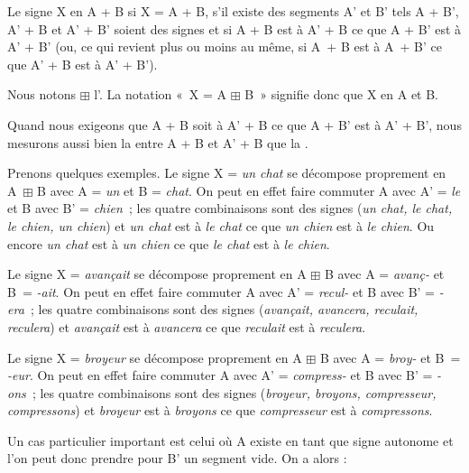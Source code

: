 {Le signe X  en A + B si X = A + B, s’il existe des segments A’ et B’ tels A + B’, A’ + B et A’ + B’ soient des signes et si {A +} {B est à A’} {+} {B ce que A +} {B’} {est à A’} {+} {B’} (ou, ce qui revient plus ou moins au même, si A~+ B est à A~+ B’ ce que A’ + B est à A’ + B’).}

{Nous notons ${\boxplus}$ l’. La notation «~X = A ${\boxplus}$ B~» signifie donc que X  en A et B.}

Quand nous exigeons que A + B soit à A’ + B ce que A + B’ est à A’ + B’, nous mesurons aussi bien la  entre A + B et A’ + B que la .

Prenons quelques exemples. Le signe X = \textit{un chat} se décompose proprement en A~${\boxplus}$ B avec A = \textit{un} et B = \textit{chat}. On peut en effet faire commuter A avec A’ = \textit{le} et B avec B’ = \textit{chien~}; les quatre combinaisons sont des signes (\textit{un chat, le chat, le chien, un chien}) et \textit{un chat} est à \textit{le chat} ce que \textit{un chien} est à \textit{le chien}. Ou encore \textit{un chat} est à \textit{un chien} ce que \textit{le chat} est à \textit{le chien}.

Le signe X = \textit{avançait} se décompose proprement en A ${\boxplus}$ B avec A = \textit{avanç-} et B~= \textit{{}-ait}. On peut en effet faire commuter A avec A’ = \textit{recul-} et B avec B’ = \textit{{}-era~}; les quatre combinaisons sont des signes (\textit{avançait, avancera, reculait, reculera}) et \textit{avançait} est à \textit{avancera} ce que \textit{reculait} est à \textit{reculera}.

Le signe X = \textit{broyeur} se décompose proprement en A ${\boxplus}$ B avec A = \textit{broy-} et B~=  \textit{{}-eur}. On peut en effet faire commuter A avec A’ = \textit{compress-} et B avec B’ =     \textit{{}-ons~}; les quatre combinaisons sont des signes (\textit{broyeur, broyons, compresseur, compressons}) et \textit{broyeur} est à \textit{broyons} ce que \textit{compresseur} est à \textit{compressons}.

Un cas particulier important est celui où A existe en tant que signe autonome et l’on peut donc prendre pour B’ un segment vide. On a alors :

